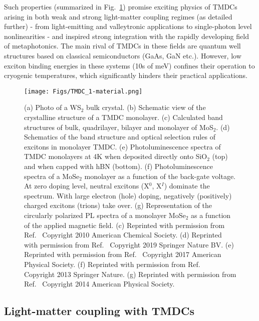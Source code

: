 \documentclass[journal=chreay,manuscript=review]{achemso}
\begin{document}
Such properties (summarized in Fig.~\ref{fig:TMDC1material}) promise exciting physics of TMDCs arising in both weak and strong light-matter coupling regimes (as detailed further) - from light-emitting and valleytronic applications to single-photon level nonlinearities - and inspired strong integration with the rapidly developing field of metaphotonics\cite{krasnok2018nanophotonics}. The main rival of TMDCs in these fields are quantum well structures based on classical semiconductors (GaAs, GaN etc.). However, low exciton binding energies in these systems (10s of meV) confines their operation to cryogenic temperatures, which significantly hinders their practical applications.

\begin{figure}
    \centering
    \texttt{[image: Figs/TMDC\_1-material.png]}
    \caption{
    (a) Photo of a WS$_2$ bulk crystal. (b) Schematic view of the crystalline structure of a TMDC monolayer. (c) Calculated band structures of bulk, quadrilayer, bilayer and monolayer of MoS$_2$. (d) Schematics of the band structure and optical selection rules of excitons in monolayer TMDC. (e) Photoluminescence spectra of TMDC monolayers at 4K when deposited directly onto SiO$_2$ (top) and when capped with hBN (bottom). (f) Photoluminescence spectra of a MoSe$_2$ monolayer as a function of the back-gate voltage. At zero doping level, neutral excitons (X$^0$, X$^I$) dominate the spectrum. With large electron (hole) doping, negatively (positively) charged excitons (trions) take over. (g) Representation of the circularly polarized PL spectra of a monolayer MoSe$_2$ as a function of the applied magnetic field. (c) Reprinted with permission from Ref.~ Copyright 2010 American Chemical Society. (d) Reprinted with permission from Ref.~ Copyright 2019 Springer Nature BV. (e) Reprinted with permission from Ref.~ Copyright 2017 American Physical Society. (f) Reprinted with permission from Ref.~ Copyright 2013 Springer Nature. (g) Reprinted with permission from Ref.~ Copyright 2014 American Physical Society.}
    \label{fig:TMDC1material}
\end{figure}

\subsection{Light-matter coupling with TMDCs}
\end{document}
